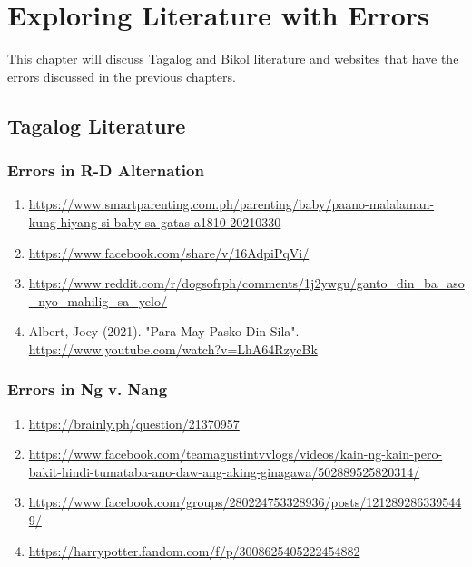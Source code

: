 \chapter{Exploring Literature with Errors}

This chapter will discuss Tagalog and Bikol literature and websites that have the errors discussed in the previous chapters.

\section{Tagalog Literature}
\subsection{Errors in R-D Alternation}
\begin{enumerate}
    \item \url{https://www.smartparenting.com.ph/parenting/baby/paano-malalaman-kung-hiyang-si-baby-sa-gatas-a1810-20210330}
    \item \url{https://www.facebook.com/share/v/16AdpiPqVi/}
    \item \url{https://www.reddit.com/r/dogsofrph/comments/1j2ywgu/ganto_din_ba_aso_nyo_mahilig_sa_yelo/}
    \item Albert, Joey (2021). "Para May Pasko Din Sila". \url{https://www.youtube.com/watch?v=LhA64RzycBk}
\end{enumerate}

\subsection{Errors in Ng v. Nang}

\begin{enumerate}
    \item \url{https://brainly.ph/question/21370957} \\
    \item \url{https://www.facebook.com/teamagustintvvlogs/videos/kain-ng-kain-pero-bakit-hindi-tumataba-ano-daw-ang-aking-ginagawa/502889525820314/} \\
    \item \url{https://www.facebook.com/groups/280224753328936/posts/1212892863395449/} \\
    \item \url{https://harrypotter.fandom.com/f/p/3008625405222454882} \\
\end{enumerate}

